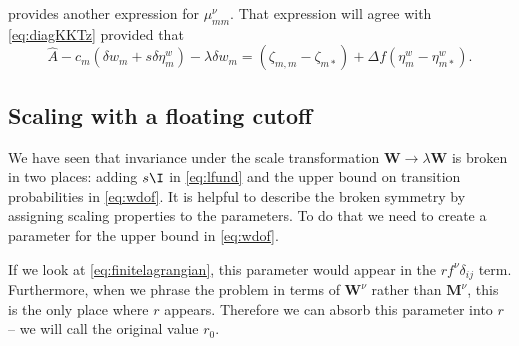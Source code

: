 \documentclass[12pt]{article}
\newcommand{\etwm}{\eta^w}
\newcommand{\dgnm}{\zeta}
\newcommand{\wm}{w}
\newcommand{\Wm}{W}
\newcommand{\W}{\mathbf{\Wm}}
\newcommand{\MMdm}{M}
\newcommand{\MMd}{\mathbf{\MMdm}}
\newcommand{\kktm}{\mu}
\begin{document}
 provides another expression for \(\kktm^\nu_{mm}\).
That expression will agree with \cref{eq:diagKKTz} provided that
%
\begin{equation}\label{eq:diagAgree}
    \hat{A} - c_m (\delta \wm_m + s \delta \etwm_m)
      - \lambda \delta w_m 
      = (\dgnm_{m,m} - \dgnm_{m*}) 
        + \Delta f (\etwm_m - \etwm_{m*}).
\end{equation}
% 


\subsection{Scaling with a floating cutoff}\label{sec:cutoff}

We have seen that invariance under the scale transformation \(\W \to \lambda\W \) is broken in two places: adding \(s\I \) in \cref{eq:lfund} and the upper bound on transition probabilities in \cref{eq:wdof}.
It is helpful to describe the broken symmetry by assigning scaling properties to the parameters.
To do that we need to create a parameter for the upper bound in \cref{eq:wdof}.

If we look at \cref{eq:finitelagrangian}, this parameter would appear in the \(r f^\nu \delta_{ij}\) term.
Furthermore, when we phrase the problem in terms of \(\W^\nu \) rather than \(\MMd^\nu \), this is the only place where \(r\) appears.
Therefore we can absorb this parameter into \(r\) -- we will call the original value \(r_0\).
\end{document}
